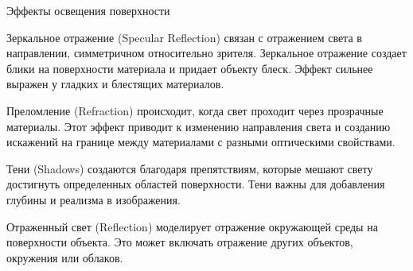 \documentclass{beamer}
\begin{document}
\begin{frame}{Эффекты освещения поверхности}
{			Зеркальное отражение (Specular Reflection) связан с отражением света в направлении, симметричном относительно зрителя. Зеркальное отражение создает блики на поверхности материала и придает объекту блеск. Эффект сильнее выражен у гладких и блестящих материалов.
			
			Преломление (Refraction) происходит, когда свет проходит через прозрачные материалы. Этот эффект приводит к изменению направления света и созданию искажений на границе между материалами с разными оптическими свойствами.
	
			Тени (Shadows) создаются благодаря препятствиям, которые мешают свету достигнуть определенных областей поверхности. Тени важны для добавления глубины и реализма в изображения.

			Отраженный свет (Reflection) моделирует отражение окружающей среды на поверхности объекта. Это может включать отражение других объектов, окружения или облаков.
	
			
		}
	\end{frame}
	\fi
\end{document}
